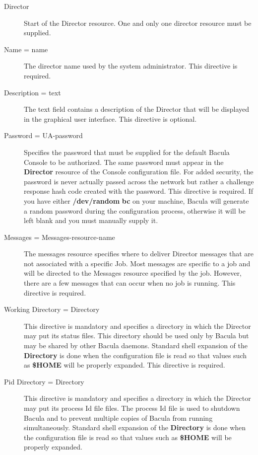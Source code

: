 \begin{description}

\item [Director]
   Start of the Director resource. One and only one  director resource must be
supplied.  

\item [Name = \lt{}name\gt{}]
   The director name used by the system  administrator. This directive is
required.  

\item [Description = \lt{}text\gt{}]
   The text field contains a  description of the Director that will be displayed
in the  graphical user interface. This directive is optional.  

\item [Password = \lt{}UA-password\gt{}]
   Specifies the password that  must be supplied for the default Bacula Console
to be  authorized. The same password must appear in the  {\bf Director}
resource of the Console configuration file.  For added security, the password
is never actually passed  across the network but rather a challenge response
hash code  created with the password. This directive is required. If you  have
either {\bf /dev/random} {\bf bc} on your machine,  Bacula will generate a
random password during the  configuration process, otherwise it will be left
blank and  you must manually supply it.  

\item [Messages = \lt{}Messages-resource-name\gt{}]
   The messages resource  specifies where to deliver Director messages that are
not associated  with a specific Job. Most messages are specific to a job and
will  be directed to the Messages resource specified by the job. However, 
there are a few messages that can occur when no job is running.  This
directive is required.  

\item [Working Directory = \lt{}Directory\gt{}]
   This directive  is mandatory and specifies a directory in which the Director 
may put its status files. This directory should be used only  by Bacula but
may be shared by other Bacula daemons.  Standard shell expansion of the {\bf
Directory}  is done when the configuration file is read so that values such 
as {\bf \$HOME} will be properly expanded. This directive is required.  

\item [Pid Directory = \lt{}Directory\gt{}]
   This directive  is mandatory and specifies a directory in which the Director 
may put its process Id file files. The process Id file is used to  shutdown
Bacula and to prevent multiple copies of  Bacula from running simultaneously. 
Standard shell expansion of the {\bf Directory}  is done when the
configuration file is read so that values such  as {\bf \$HOME} will be
properly expanded.  


\end{description}
